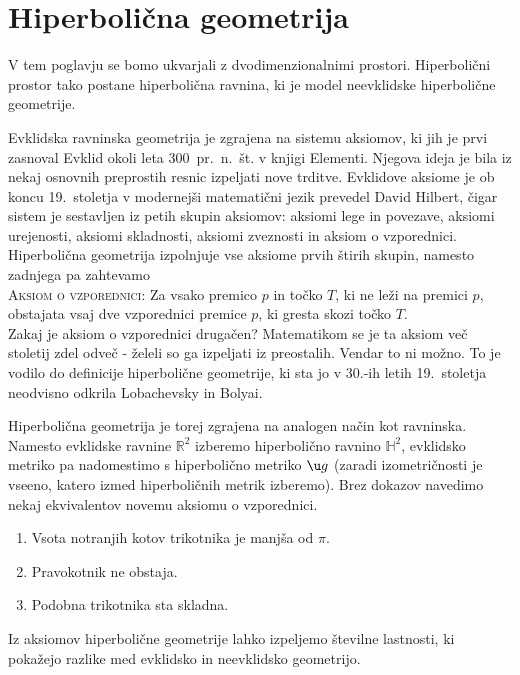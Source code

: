 \documentclass[a4paper]{article}
\begin{document}
\section{Hiperbolična geometrija}

V tem poglavju se bomo ukvarjali z dvodimenzionalnimi prostori. Hiperbolični prostor tako postane hiperbolična ravnina, ki je model neevklidske hiperbolične geometrije.

Evklidska ravninska geometrija je zgrajena na sistemu aksiomov, ki jih je prvi zasnoval Evklid okoli leta 300~pr.~n.~št. v knjigi Elementi. Njegova ideja je bila iz nekaj osnovnih preprostih resnic izpeljati nove trditve. Evklidove aksiome je ob koncu 19.~stoletja v modernejši matematični jezik prevedel David Hilbert, čigar sistem je sestavljen iz petih skupin aksiomov: aksiomi lege in povezave, aksiomi urejenosti, aksiomi skladnosti, aksiomi zveznosti in aksiom o vzporednici.
Hiperbolična geometrija izpolnjuje vse aksiome prvih štirih skupin, namesto zadnjega pa zahtevamo \\[0.4cm]
\textsc{Aksiom o vzporednici}: Za vsako premico $p$ in točko $T$, ki ne leži na premici $p$, obstajata vsaj dve vzporednici premice $p$, ki gresta skozi točko $T$. \\[0.4cm]
Zakaj je aksiom o vzporednici drugačen? Matematikom se je ta aksiom več stoletij zdel odveč - želeli so ga izpeljati iz preostalih. Vendar to ni možno. To je vodilo do definicije hiperbolične geometrije, ki sta jo v 30.-ih letih 19.~stoletja neodvisno odkrila Lobachevsky in Bolyai.

Hiperbolična geometrija je torej zgrajena na analogen način kot ravninska. Namesto evklidske ravnine $\mathbb{R}^2$ izberemo hiperbolično ravnino $\mathbb{H}^2$, evklidsko metriko pa nadomestimo s hiperbolično metriko $\u g$ (zaradi izometričnosti je vseeno, katero izmed hiperboličnih metrik izberemo).
Brez dokazov navedimo nekaj ekvivalentov novemu aksiomu o vzporednici.
\begin{enumerate}
\item Vsota notranjih kotov trikotnika je manjša od $\pi$.
\item Pravokotnik ne obstaja.
\item Podobna trikotnika sta skladna.
\end{enumerate}
Iz aksiomov hiperbolične geometrije lahko izpeljemo številne lastnosti, ki pokažejo razlike med evklidsko in neevklidsko geometrijo.
\end{document}
